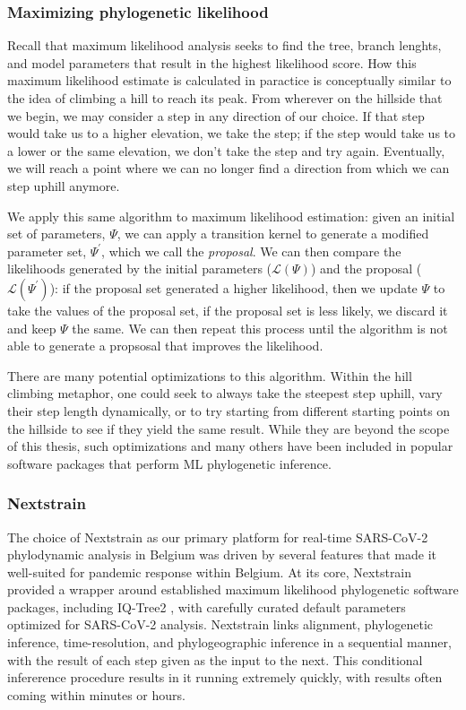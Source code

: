 \subsubsection{Maximizing phylogenetic likelihood}
Recall that maximum likelihood analysis seeks to find the tree, branch lenghts, and model parameters that result in the highest likelihood score.
How this maximum likelihood estimate is calculated in paractice is conceptually similar to the idea of climbing a hill to reach its peak.
From wherever on the hillside that we begin, we may consider a step in any direction of our choice.
If that step would take us to a higher elevation, we take the step; if the step would take us to a lower or the same elevation, we don't take the step and try again.
Eventually, we will reach a point where we can no longer find a direction from which we can step uphill anymore.

We apply this same algorithm to maximum likelihood estimation: given an initial set of parameters, $\Psi$, we can apply a transition kernel to generate a modified parameter set, $\Psi^{\prime}$, which we call the \textit{proposal}.
We can then compare the likelihoods generated by the initial parameters ($\mathcal{L}(\Psi)$) and the proposal ($\mathcal{L}(\Psi^{\prime})$): if the proposal set generated a higher likelihood, then we update $\Psi$ to take the values of the proposal set, if the proposal set is less likely, we discard it and keep $\Psi$ the same.
We can then repeat this process until the algorithm is not able to generate a propsosal that improves the likelihood.

There are many potential optimizations to this algorithm.
Within the hill climbing metaphor, one could seek to always take the steepest step uphill, vary their step length dynamically, or to try starting from different starting points on the hillside to see if they yield the same result.
While they are beyond the scope of this thesis, such optimizations and many others have been included in popular software packages that perform ML phylogenetic inference.

\subsubsection{Nextstrain}
The choice of Nextstrain \citep{hadfield2018nextstrain} as our primary platform for real-time SARS-CoV-2 phylodynamic analysis in Belgium was driven by several features that made it well-suited for pandemic response within Belgium.
At its core, Nextstrain provided a wrapper around established maximum likelihood phylogenetic software packages, including IQ-Tree2 \citep{minh2020iq}, with carefully curated default parameters optimized for SARS-CoV-2 analysis.
Nextstrain links alignment, phylogenetic inference, time-resolution, and phylogeographic inference in a sequential manner, with the result of each step given as the input to the next.
This conditional infererence procedure results in it running extremely quickly, with results often coming within minutes or hours.

